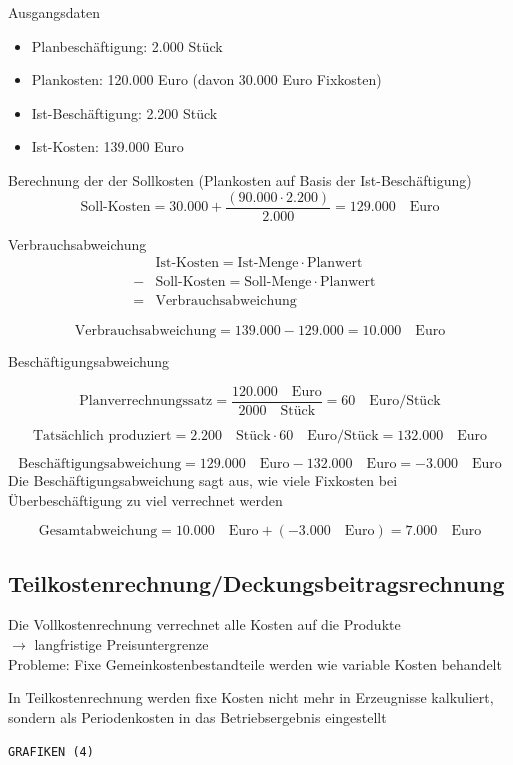 \documentclass[a4paper,11pt, twoside]{article}
\begin{document}
Ausgangsdaten
\begin{itemize}
	\item Planbeschäftigung: 2.000 Stück
	\item Plankosten: 120.000 Euro (davon 30.000 Euro Fixkosten)
	\item Ist-Beschäftigung: 2.200 Stück
	\item Ist-Kosten: 139.000 Euro
\end{itemize}

Berechnung der der Sollkosten (Plankosten auf Basis der Ist-Beschäftigung)
\[
\text{Soll-Kosten} = 30.000 + \frac{(90.000 \cdot 2.200)}{2.000} = 129.000 \quad \text{Euro}
\]

Verbrauchsabweichung
\[
\begin{aligned}
 & \text{Ist-Kosten} = \text{Ist-Menge} \cdot \text{Planwert}\\
 - & \text{Soll-Kosten} = \text{Soll-Menge} \cdot \text{Planwert}\\\hline
 = & \text{Verbrauchsabweichung}
 & \end{aligned}
\]

\[
\text{Verbrauchsabweichung} = 139.000 - 129.000 = 10.000 \quad \text{Euro}
\]

Beschäftigungsabweichung

\[
\text{Planverrechnungssatz} = \frac{120.000\quad \text{Euro}}{2000\quad \text{Stück}} = 60\quad \text{Euro/Stück}
\]

\[
\text{Tatsächlich produziert} = 2.200\quad \text{Stück} \cdot 60\quad \text{Euro/Stück} = 132.000\quad \text{Euro}
\]

\[
\text{Beschäftigungsabweichung} = 129.000\quad \text{Euro} - 132.000\quad \text{Euro} = -3.000\quad \text{Euro}
\]
Die Beschäftigungsabweichung sagt aus, wie viele Fixkosten bei Überbeschäftigung zu viel verrechnet werden

\[
\text{Gesamtabweichung} = 10.000\quad \text{Euro} + (-3.000\quad \text{Euro}) = 7.000\quad \text{Euro}
\]

\subsection{Teilkostenrechnung/Deckungsbeitragsrechnung}

Die Vollkostenrechnung verrechnet alle Kosten auf die Produkte\\
$\rightarrow$ langfristige Preisuntergrenze\\
Probleme: Fixe Gemeinkostenbestandteile werden wie variable Kosten behandelt

In Teilkostenrechnung werden fixe Kosten nicht mehr in Erzeugnisse kalkuliert, sondern als Periodenkosten in das Betriebsergebnis eingestellt

\texttt{GRAFIKEN (4)}
\end{document}
